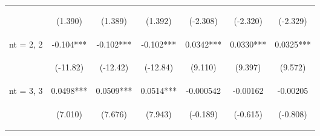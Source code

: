 \documentclass[]{standalone}
\begin{document}
\begin{tabular}{lcccccc}
    \vspace{4pt}     & \begin{footnotesize}(1.390)\end{footnotesize}  & \begin{footnotesize}(1.389)\end{footnotesize}  & \begin{footnotesize}(1.392)\end{footnotesize}  & \begin{footnotesize}(-2.308)\end{footnotesize} & \begin{footnotesize}(-2.320)\end{footnotesize} & \begin{footnotesize}(-2.329)\end{footnotesize} \\
    nt = 2, 2        & -0.104***                                      & -0.102***                                      & -0.102***                                      & 0.0342***                                      & 0.0330***                                      & 0.0325***                                      \\
    \vspace{4pt}     & \begin{footnotesize}(-11.82)\end{footnotesize} & \begin{footnotesize}(-12.42)\end{footnotesize} & \begin{footnotesize}(-12.84)\end{footnotesize} & \begin{footnotesize}(9.110)\end{footnotesize}  & \begin{footnotesize}(9.397)\end{footnotesize}  & \begin{footnotesize}(9.572)\end{footnotesize}  \\
    nt = 3, 3        & 0.0498***                                      & 0.0509***                                      & 0.0514***                                      & -0.000542                                      & -0.00162                                       & -0.00205                                       \\
    \vspace{4pt}     & \begin{footnotesize}(7.010)\end{footnotesize}  & \begin{footnotesize}(7.676)\end{footnotesize}  & \begin{footnotesize}(7.943)\end{footnotesize}  & \begin{footnotesize}(-0.189)\end{footnotesize} & \begin{footnotesize}(-0.615)\end{footnotesize} & \begin{footnotesize}(-0.808)\end{footnotesize} \\

\end{tabular}
\end{document}
